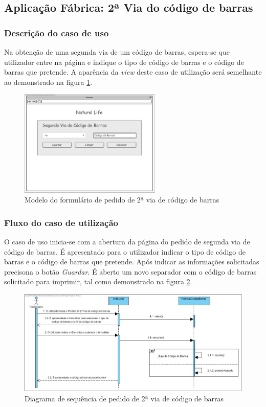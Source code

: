 \subsection{Aplicação Fábrica: 2ª Via do código de barras}
\subsubsection*{Descrição do caso de uso}
Na obtenção de uma segunda via de um código de barras, espera-se que utilizador entre na página e indique o tipo de código de barras e o código de barras que pretende. A aparência da \textit{view} deste caso de utilização será semelhante ao demonstrado na figura \ref{fig:di_2_via}. 

\begin{figure}[H] 
	\begin{center}
		\includegraphics[width=0.60\textwidth,keepaspectratio]{figuras/Diagramas_vp/DI_Fabrica_6_2_Via_Codigo_de_Barras.jpg}
		\caption{Modelo do formulário de pedido de 2ª via de código de barras}
		\label{fig:di_2_via} 
	\end{center}
\end{figure}

\subsubsection*{Fluxo do caso de utilização}
O caso de uso inicia-se com a abertura da página do pedido de segunda via de código de barras. É apresentado para o utilizador indicar o tipo de código de barras e o código de barras que pretende. Após indicar as informações solicitadas precisona o botão \textit{Guardar}. É aberto um novo separador com o código de barras solicitado para imprimir, tal como demonstrado na figura \ref{fig:sd_2_via}.

\begin{figure}[H] 
	\begin{center}
		\includegraphics[width=\textwidth,keepaspectratio]{figuras/Diagramas_vp/SD_Fabrica_6_2_Via_Codigo_de_Barras.jpg}
		\caption{Diagrama de sequência de pedido de 2ª via de código de barras}
		\label{fig:sd_2_via} 
	\end{center}
\end{figure}